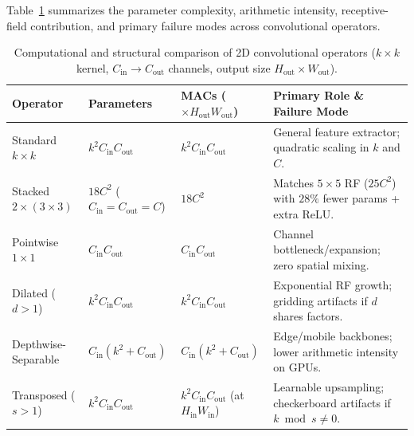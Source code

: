 \documentclass[../../../../master.tex]{subfiles}
\begin{document}
Table~\ref{tab:cnn:ops_compare} summarizes the parameter complexity, arithmetic intensity, receptive-field contribution, and primary failure modes across convolutional operators.

\begin{table}[htbp]
\centering
\small
\caption{Computational and structural comparison of 2D convolutional operators ($k \times k$ kernel, $C_{\mathrm{in}} \to C_{\mathrm{out}}$ channels, output size $H_{\mathrm{out}} \times W_{\mathrm{out}}$).}
\label{tab:cnn:ops_compare}
\begin{tabularx}{\textwidth}{@{} >{\raggedright\arraybackslash}p{3.0cm} >{\raggedright\arraybackslash}p{2.5cm} >{\raggedright\arraybackslash}p{2.9cm} >{\raggedright\arraybackslash}X @{}}
\toprule
\textbf{Operator} & \textbf{Parameters} & \textbf{MACs ($\times H_{\mathrm{out}} W_{\mathrm{out}}$)} & \textbf{Primary Role \& Failure Mode} \\
\midrule
Standard $k \times k$ & $k^2 C_{\mathrm{in}} C_{\mathrm{out}}$ & $k^2 C_{\mathrm{in}} C_{\mathrm{out}}$ & General feature extractor; quadratic scaling in $k$ and $C$. \\
Stacked $2 \times (3 \times 3)$ & $18 C^2$ ($C_{\mathrm{in}}=C_{\mathrm{out}}=C$) & $18 C^2$ & Matches $5 \times 5$ RF ($25 C^2$) with $28\%$ fewer params + extra ReLU. \\
Pointwise $1 \times 1$ & $C_{\mathrm{in}} C_{\mathrm{out}}$ & $C_{\mathrm{in}} C_{\mathrm{out}}$ & Channel bottleneck/expansion; zero spatial mixing. \\
Dilated ($d > 1$) & $k^2 C_{\mathrm{in}} C_{\mathrm{out}}$ & $k^2 C_{\mathrm{in}} C_{\mathrm{out}}$ & Exponential RF growth; gridding artifacts if $d$ shares factors. \\
Depthwise-Separable & $C_{\mathrm{in}}(k^2 + C_{\mathrm{out}})$ & $C_{\mathrm{in}}(k^2 + C_{\mathrm{out}})$ & Edge/mobile backbones; lower arithmetic intensity on GPUs. \\
Transposed ($s > 1$) & $k^2 C_{\mathrm{in}} C_{\mathrm{out}}$ & $k^2 C_{\mathrm{in}} C_{\mathrm{out}}$ (at $H_{\mathrm{in}} W_{\mathrm{in}}$) & Learnable upsampling; checkerboard artifacts if $k \bmod s \neq 0$. \\
\bottomrule
\end{tabularx}
\end{table}
\end{document}
